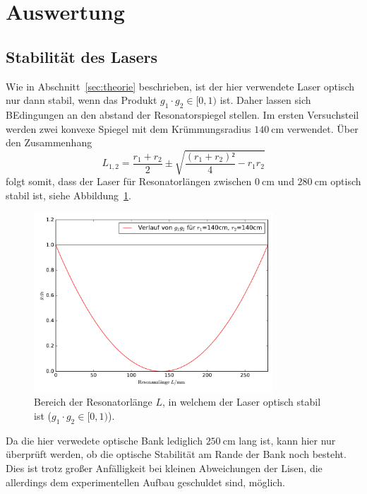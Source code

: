 ﻿\section{Auswertung}
\label{sec:auswertung}

%
\subsection{Stabilität des Lasers}
%
Wie in Abschnitt~\ref{sec:theorie} beschrieben, ist der hier verwendete Laser optisch nur dann stabil, wenn das Produkt $g_1\cdot g_2\in[0,1)$ ist. Daher lassen sich BEdingungen an den abstand der Resonatorspiegel stellen. Im ersten Versuchsteil werden zwei konvexe Spiegel mit dem Krümmungsradius $\SI{140}{\centi\meter}$ verwendet. Über den Zusammenhang
%
\begin{equation}
  L_{1,2}=\frac{r_1+r_2}{2}\pm\sqrt{\frac{(r_1+r_2)²}{4}-r_1r_2}
\end{equation}
%
folgt somit, dass der Laser für Resonatorlängen zwischen $\SI{0}{\centi\meter}$ und $\SI{280}{\centi\meter}$ optisch stabil ist, siehe Abbildung~\ref{fig:opt_stab}.
%
\begin{figure}[htb]
  \centering
  \includegraphics[width=0.8\textwidth]{auswertung/plot_laser_140_140.pdf}
  \caption{Bereich der Resonatorlänge $L$, in welchem der Laser optisch stabil ist ($g_1\cdot g_2\in[0,1)$).}
  \label{fig:opt_stab}
\end{figure}
%
Da die hier verwedete optische Bank lediglich $\SI{250}{\centi\meter}$ lang ist, kann hier nur überprüft werden, ob die optische Stabilität am
Rande der Bank noch besteht. Dies ist trotz großer Anfälligkeit bei kleinen Abweichungen der Lisen, die allerdings dem experimentellen Aufbau
geschuldet sind, möglich.
%
